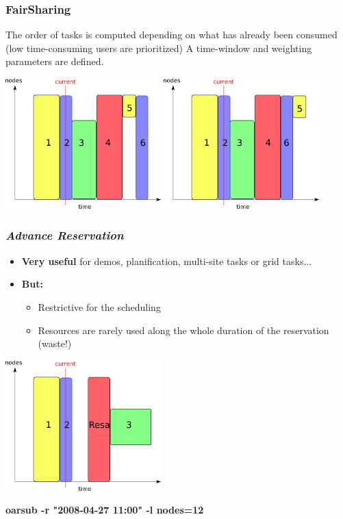 \documentclass{beamer}
\begin{document}
\begin{frame}
	\frametitle{FairSharing}
        The order of tasks is computed depending on what has already been consumed (low time-consuming users are prioritized)
	A time-window and weighting parameters are defined.
	\begin{center}
		\includegraphics[width=6cm]{fifo.png}
		\includegraphics[width=6cm]{fairsharing.png}
	\end{center}
\end{frame}

\begin{frame}
	\frametitle{{\em Advance Reservation}}

		\begin{itemize}
		\item {\bf Very useful} for demos, planification, multi-site tasks or grid tasks...
		\item {\bf But:}
			\begin{itemize}
				\item Restrictive for the scheduling
				\item Resources are rarely used along the whole duration of the reservation (waste!)
			\end{itemize}
		\end{itemize}

	\begin{center}
		\includegraphics[width=6cm]{resa.png}
	\end{center}
	{\bf oarsub -r "2008-04-27 11:00" -l nodes=12}

\end{frame}
\end{document}
